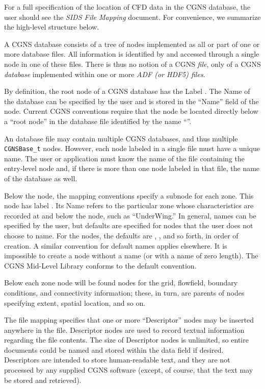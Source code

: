 For a full specification of the location of CFD data in the
CGNS database, the user should see the \textit{SIDS File Mapping}
document.
For convenience, we summarize the high-level structure below.

A CGNS database consists of a tree of nodes implemented as all or part
of one or more database files.
All information is identified by and accessed through a single node in
one of these files.
There is thus no notion of a CGNS \textit{file}, only of a CGNS
\textit{database} implemented within one or more \textit{ADF (or HDF5)
files}.

By definition, the root node of a CGNS database has the Label
.
The Name of the database can be specified by the user and is stored in
the ``Name'' field of the  node.
Current CGNS conventions require that the  node be
located directly below a ``root node'' in the database file
identified by the name ``\fort{/}''.

An database file may contain multiple CGNS databases, and thus
multiple \texttt{CGNSBase\_t} nodes.
However, each node labeled  in a single
file must have a unique name.
The user or application must know the name of the file containing
the entry-level node and, if there is more than one node labeled
 in that file, the name of the database as well.

Below the  node, the mapping conventions specify a
subnode for each zone.
This node has label .
Its Name refers to the particular zone whose characteristics are
recorded at and below the node, such as ``UnderWing.''
In general, names can be specified by the user, but defaults are
specified for nodes that the user does not choose to name.
For the  nodes, the defaults are ,
, and so forth, in order of creation.
A similar convention for default names applies elsewhere.
It is impossible to create a node without a name (or with a name of zero
length).
The CGNS Mid-Level Library conforms to the default convention.

Below each zone node will be found nodes for the grid, flowfield,
boundary conditions, and connectivity information; these, in turn, are
parents of nodes specifying extent, spatial location, and so on.

The file mapping specifies that one or more ``Descriptor'' nodes may be
inserted anywhere in the file.
Descriptor nodes are used to record textual information regarding the
file contents.
The size of Descriptor nodes is unlimited, so entire documents could be
named and stored within the data field if desired.
Descriptors are intended to store human-readable text, and they are not
processed by any supplied CGNS software (except, of course, that the
text may be stored and retrieved).

